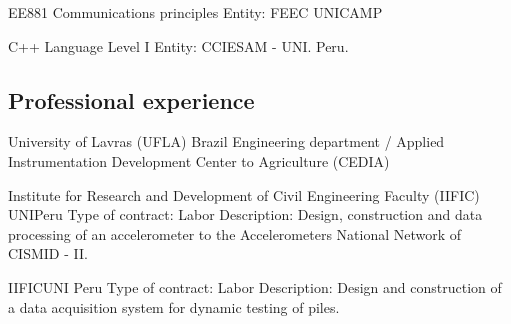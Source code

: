 \documentclass[11pt,a4paper,sans]{moderncv} %
\begin{document}
			  {EE881 }{Communications principles}{}
			  {Entity: FEEC UNICAMP }

	      {C++ Language}{ Level I}{}
	      {Entity: CCIESAM - UNI. Peru.}

\subsection{Professional experience}
	      {University of Lavras (UFLA)}
	      {}{Brazil}
	      {Engineering department / Applied Instrumentation Development Center to Agriculture (CEDIA) }


		      {Institute for Research and Development of Civil Engineering Faculty (IIFIC)}
		      {UNI}{Peru}
		      {Type of contract: Labor\newline{}
		      Description: Design, construction and data processing of an accelerometer 
		      to the Accelerometers National Network  of CISMID - II.}

		      {IIFIC}{UNI }{Peru}
		      {Type of contract: Labor\newline{}
		      Description: Design and construction  of  a data acquisition system for dynamic testing of piles.}



\end{document}
